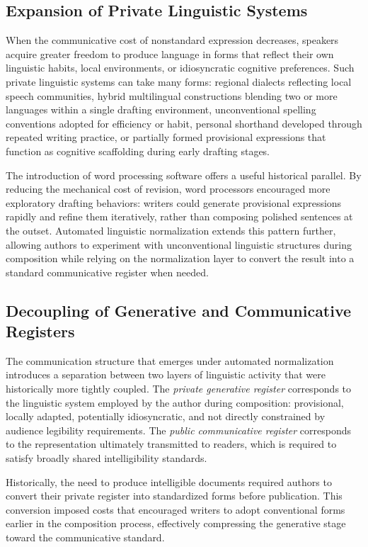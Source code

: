 \documentclass[12pt,a4paper]{article}
\theoremstyle{definition}
\theoremstyle{plain}
\theoremstyle{remark}
\begin{document}
\subsection{Expansion of Private Linguistic Systems}

When the communicative cost of nonstandard expression decreases, speakers acquire greater
freedom to produce language in forms that reflect their own linguistic habits, local
environments, or idiosyncratic cognitive preferences. Such private linguistic systems can
take many forms: regional dialects reflecting local speech communities, hybrid multilingual
constructions blending two or more languages within a single drafting environment,
unconventional spelling conventions adopted for efficiency or habit, personal shorthand
developed through repeated writing practice, or partially formed provisional expressions
that function as cognitive scaffolding during early drafting stages.

The introduction of word processing software offers a useful historical parallel. By reducing
the mechanical cost of revision, word processors encouraged more exploratory drafting
behaviors: writers could generate provisional expressions rapidly and refine them iteratively,
rather than composing polished sentences at the outset. Automated linguistic normalization
extends this pattern further, allowing authors to experiment with unconventional linguistic
structures during composition while relying on the normalization layer to convert the result
into a standard communicative register when needed.

\subsection{Decoupling of Generative and Communicative Registers}

The communication structure that emerges under automated normalization introduces a
separation between two layers of linguistic activity that were historically more tightly
coupled. The \emph{private generative register} corresponds to the linguistic system employed
by the author during composition: provisional, locally adapted, potentially idiosyncratic,
and not directly constrained by audience legibility requirements. The \emph{public
communicative register} corresponds to the representation ultimately transmitted to readers,
which is required to satisfy broadly shared intelligibility standards.

Historically, the need to produce intelligible documents required authors to convert their
private register into standardized forms before publication. This conversion imposed costs
that encouraged writers to adopt conventional forms earlier in the composition process,
effectively compressing the generative stage toward the communicative standard.
\end{document}
